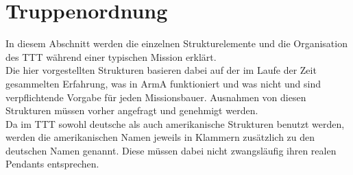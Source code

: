 \chapter{Truppenordnung}
In diesem Abschnitt werden die einzelnen Strukturelemente und die Organisation des \ac{TTT} während einer typischen Mission erklärt.\\
Die hier vorgestellten Strukturen basieren dabei auf der im Laufe der Zeit gesammelten Erfahrung, was in ArmA funktioniert und was nicht und sind verpflichtende Vorgabe für jeden Missionsbauer. Ausnahmen von diesen Strukturen müssen vorher angefragt und genehmigt werden.\\
Da im \ac{TTT} sowohl deutsche als auch amerikanische Strukturen benutzt werden, werden die amerikanischen Namen jeweils in Klammern zusätzlich zu den deutschen Namen genannt. Diese müssen dabei nicht zwangsläufig ihren realen Pendants entsprechen.











